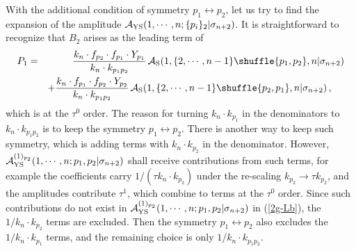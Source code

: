 \documentclass[preprint,showpacs,onecolumn,nofootinbib]{revtex4}
\newcommand{\bea}{\begin{eqnarray}}
\newcommand{\eea}{\end{eqnarray}}
\newcommand{\nn}{\nonumber \\}
\def\eref#1{(\ref{#1})}
\begin{document}
With the additional condition of symmetry $p_1\leftrightarrow p_2$, let us try to find the expansion of the amplitude ${\cal A}_{\rm YS}(1,\cdots,n;\{p_i\}_2|\sigma_{n+2})$. It is straightforward to recognize that $B_2$ arises as the leading term of
%
\bea
P_1&=&{k_n\cdot f_{p_2}\cdot f_{p_1}\cdot Y_{p_1}\over k_n\cdot k_{p_1p_2}}\,{\cal A}_{\rm S}(1,\{2,\cdots,n-1\}\shuffle \{p_1,p_2\},n|\sigma_{n+2})\nn
& &+{k_n\cdot f_{p_1}\cdot f_{p_2}\cdot Y_{p_2}\over k_n\cdot k_{p_1p_2}}\,{\cal A}_{\rm S}(1,\{2,\cdots,n-1\}\shuffle \{p_2,p_1\},n|\sigma_{n+2})\,,~~~~\label{2g-P1}
\eea
%
which is at the $\tau^0$ order. The reason for turning $k_n\cdot k_{p_1}$ in the denominators to $k_n\cdot k_{p_1p_2}$ is to keep the symmetry $p_1\leftrightarrow p_2$. There is another way to keep such symmetry, which is adding terms with $k_n\cdot k_{p_2}$ in the denominator. However, ${\cal A}^{(1)_{p_2}}_{\rm YS}(1,\cdots,n;p_1,p_2|\sigma_{n+2})$ shall receive contributions from such terms, for example the coefficients carry $1/(\tau k_n\cdot k_{p_2})$ under the re-scaling $k_{p_2}\to\tau k_{p_2}$, and the amplitudes contribute $\tau^1$, which combine to terms at the $\tau^0$ order. Since such contributions do not exist in ${\cal A}^{(1)_{p_2}}_{\rm YS}(1,\cdots,n;p_1,p_2|\sigma_{n+2})$ in \eref{2g-Lb}, the $1/k_n\cdot k_{p_2}$ terms are excluded. Then the symmetry $p_1\leftrightarrow p_2$ also excludes the $1/k_n\cdot k_{p_1}$ terms, and the remaining choice is only $1/k_n\cdot k_{p_1p_2}$.
\end{document}
